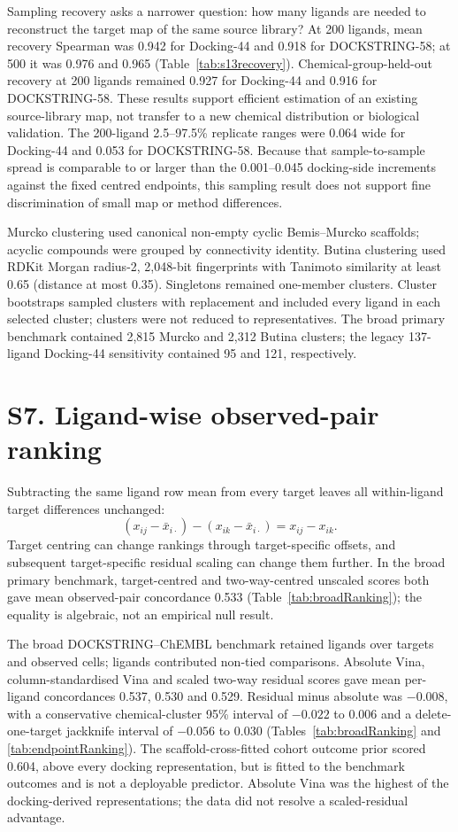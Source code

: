 \documentclass[11pt]{article}
\begin{document}
Sampling recovery asks a narrower question: how many ligands are needed to reconstruct the
target map of the same source library? At 200 ligands, mean recovery Spearman was 0.942 for
Docking-44 and 0.918 for DOCKSTRING-58; at 500 it was 0.976 and 0.965
(Table~\ref{tab:s13recovery}). Chemical-group-held-out recovery at 200 ligands remained
0.927 for Docking-44 and 0.916 for DOCKSTRING-58. These results support efficient estimation of an existing source-library
map, not transfer to a new chemical distribution or biological validation.
The 200-ligand 2.5--97.5\% replicate ranges were 0.064 wide for Docking-44 and 0.053 for
DOCKSTRING-58. Because that sample-to-sample spread is comparable to or larger than the
0.001--0.045 docking-side increments against the fixed centred endpoints, this sampling
result does not support fine discrimination of small map or method differences.

Murcko clustering used canonical non-empty cyclic Bemis--Murcko scaffolds; acyclic compounds
were grouped by connectivity identity. Butina clustering used RDKit Morgan radius-2,
2,048-bit fingerprints with Tanimoto similarity at least 0.65 (distance at most 0.35).
Singletons remained one-member clusters. Cluster bootstraps sampled clusters with
replacement and included every ligand in each selected cluster; clusters were not reduced
to representatives. The broad primary benchmark contained 2,815 Murcko and 2,312 Butina
clusters; the legacy 137-ligand Docking-44 sensitivity contained 95 and 121, respectively.

\section*{S7. Ligand-wise observed-pair ranking}

Subtracting the same ligand row mean from every target leaves all within-ligand target
differences unchanged:
\[
(x_{ij}-\bar{x}_{i\cdot})-(x_{ik}-\bar{x}_{i\cdot})=x_{ij}-x_{ik}.
\]
Target centring can change rankings through target-specific offsets, and subsequent
target-specific residual scaling can change them further. In the broad primary benchmark,
target-centred and two-way-centred unscaled scores both gave mean observed-pair concordance
0.533 (Table~\ref{tab:broadRanking}); the equality is algebraic, not an empirical null
result.

The broad DOCKSTRING--ChEMBL benchmark retained \BroadRankingRetainedLigands{} ligands over
\BroadRankingTargets{} targets and \BroadRankingCells{} observed cells;
\BroadRankingEvaluatedLigands{} ligands contributed \BroadRankingPairs{} non-tied
comparisons. Absolute Vina,
column-standardised Vina and scaled two-way residual scores gave mean per-ligand
concordances 0.537, 0.530 and 0.529. Residual minus absolute was $-0.008$, with a conservative
chemical-cluster 95\% interval of $-0.022$ to 0.006 and a delete-one-target jackknife
interval of $-0.056$ to 0.030 (Tables~\ref{tab:broadRanking} and
\ref{tab:endpointRanking}). The scaffold-cross-fitted cohort outcome prior scored 0.604,
above every docking representation, but is fitted to the benchmark outcomes and is not a
deployable predictor. Absolute Vina was the highest of the docking-derived representations;
the data did not resolve a scaled-residual advantage.
\end{document}

